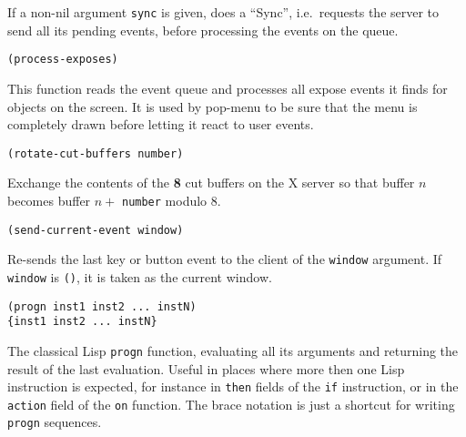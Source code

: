 If a non-nil argument \verb"sync" is given, {\GWM} does a ``Sync'',
i.e.\ requests the server to send all its pending events, before
processing the events on the queue.

        
{\usagefont\begin{verbatim}
(process-exposes)
\end{verbatim}}\usageupspace

This function reads the event queue and processes all expose events it finds
for {\GWM} objects on the screen. It is used by pop-menu to be sure that the
menu is completely drawn before letting it react to user events.


{\usagefont\begin{verbatim}
(rotate-cut-buffers number)
\end{verbatim}}\usageupspace

Exchange the contents of the {\bf 8} cut buffers on the X server so that
buffer $n$ becomes buffer $n + $ \verb"number" modulo 8.


{\usagefont\begin{verbatim}
(send-current-event window)
\end{verbatim}}\usageupspace

Re-sends the last key or button event to the client of the \verb"window"
argument. If \verb"window" is \verb"()", it is taken as the current window.

        
{\usagefont\begin{verbatim}
(progn inst1 inst2 ... instN)
{inst1 inst2 ... instN}
\end{verbatim}}\usageupspace

The classical Lisp \verb"progn" function, evaluating all its arguments and
returning the result of the last evaluation. Useful in places where
more then one Lisp instruction is expected, for instance in
\verb"then" fields of the \verb"if" instruction, or in the
\verb"action" field of the \verb"on" function. The brace notation is
just a shortcut for writing \verb"progn" sequences.

        
